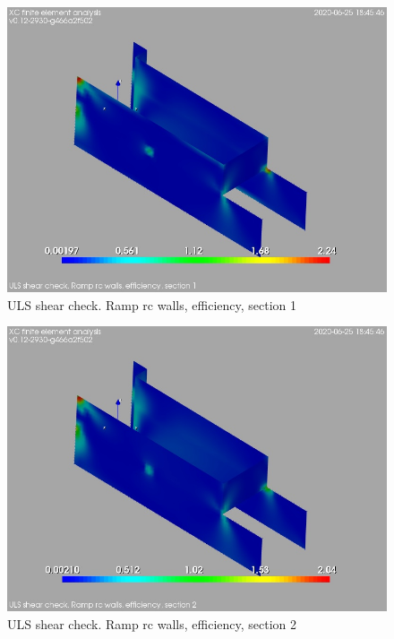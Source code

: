 \begin{figure}
\begin{center}
\includegraphics[width=\linewidth]{ramp_wall/resLC/text/graphics/shearULS/wallsCFSect1}
\caption{ULS shear check. Ramp rc walls, efficiency, section 1}
\end{center}
\end{figure}
\begin{figure}
\begin{center}
\includegraphics[width=\linewidth]{ramp_wall/resLC/text/graphics/shearULS/wallsCFSect2}
\caption{ULS shear check. Ramp rc walls, efficiency, section 2}
\end{center}
\end{figure}
